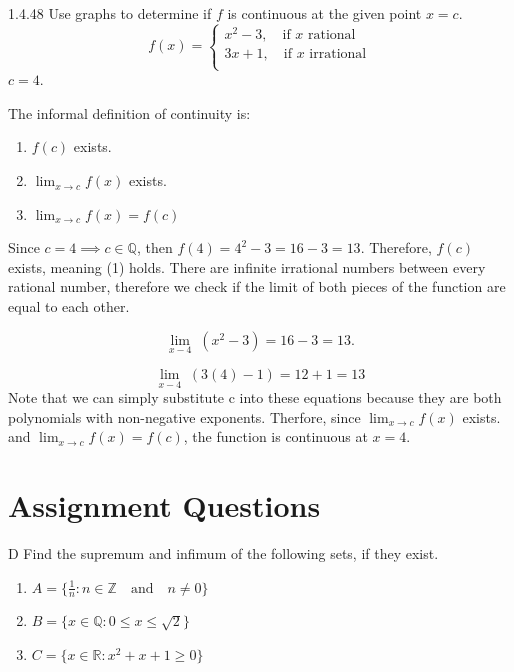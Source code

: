 \documentclass[]{article}
\begin{document}
\begin{question}{1.4.48}
    Use graphs to determine if $f$ is continuous at the given point $x = c$.
    \[
        f(x) = \begin{cases*}
            x^2-3, \quad \text{if } x \text{ rational} \\
            3x+1, \quad \text{if } x \text{ irrational} \\
        \end{cases*}
    \]
    $c = 4$.
\end{question}
The informal definition of continuity is:
\begin{center}
    \begin{enumerate}[label=(\arabic*)]
        \item $f(c)$ exists.
        \item $\displaystyle \lim_{x\rightarrow c} f(x)$ exists.
        \item $\displaystyle \lim_{x\rightarrow c} f(x) = f(c)$
    \end{enumerate}
\end{center}

Since $c = 4 \implies c \in \mathbb{Q}$, then $f(4) = 4^2 - 3 = 16 - 3 = 13.$
Therefore, $f(c)$ exists, meaning (1) holds.
\medbreak
There are infinite irrational numbers between every rational number, therefore
we check if the limit of both pieces of the function are equal to each other. 

\[
    \lim_{x-4}\;(x^2 - 3) = 16-3 = 13.
\]

\[
    \lim_{x-4}\; (3(4) - 1) = 12+1 = 13
\]
Note that we can simply substitute c into these equations because they are both polynomials with non-negative
exponents.
\medbreak
Therfore, since $\displaystyle \lim_{x\rightarrow c} f(x)$ exists. and 
$\displaystyle \lim_{x\rightarrow c} f(x) = f(c)$, the function is continuous at 
$x = 4$.
\section{Assignment Questions}
\begin{question}{D}
    Find the supremum and infimum of the following sets, if they exist.
    \begin{center}
        \begin{enumerate}[label=(\alph*)]
            \item $A = \{\frac{1}{n} : n \in \mathbb{Z} \quad \text{and} \quad n \ne 0\}$
            \item $B = \{x \in \mathbb{Q}: 0 \le x \le \sqrt{2}\}$
            \item $C = \{x \in \mathbb{R}: x^2 + x + 1 \ge 0\}$
        \end{enumerate}
    \end{center}
\end{question}
\end{document}
